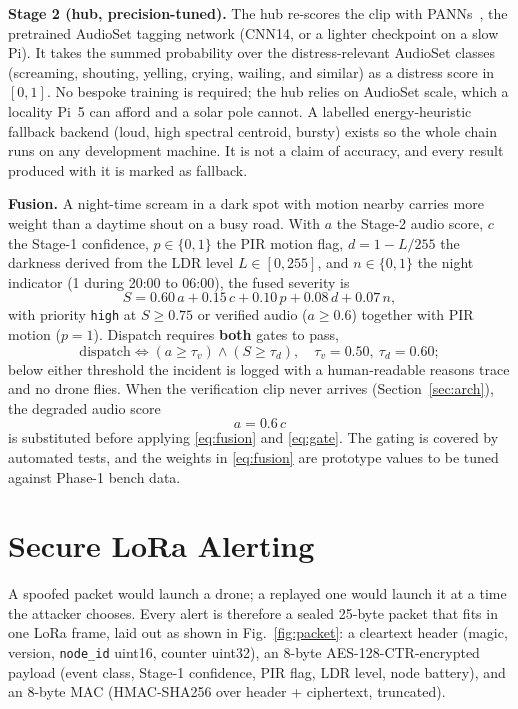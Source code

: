 \documentclass[conference]{IEEEtran}
\begin{document}
\textbf{Stage 2 (hub, precision-tuned).} The hub re-scores the clip
with PANNs~\cite{panns}, the pretrained AudioSet tagging network
(CNN14, or a lighter checkpoint on a slow Pi). It takes the summed
probability over the distress-relevant AudioSet classes (screaming,
shouting, yelling, crying, wailing, and similar) as a distress score
in $[0, 1]$. No bespoke training is required; the hub relies on
AudioSet scale, which a locality Pi~5 can afford and a solar pole
cannot. A labelled energy-heuristic fallback backend (loud, high
spectral centroid, bursty) exists so the whole chain runs on any
development machine. It is not a claim of accuracy, and every result
produced with it is marked as fallback.

\textbf{Fusion.} A night-time scream in a dark spot with motion nearby
carries more weight than a daytime shout on a busy road. With $a$
the Stage-2 audio score, $c$ the Stage-1 confidence, $p \in \{0,1\}$
the PIR motion flag, $d = 1 - L/255$ the darkness derived from the LDR
level $L \in [0,255]$, and $n \in \{0,1\}$ the night indicator (1
during 20:00 to 06:00), the fused severity is
\begin{equation}
\label{eq:fusion}
S = 0.60\,a + 0.15\,c + 0.10\,p + 0.08\,d + 0.07\,n,
\end{equation}
with priority \texttt{high} at $S \geq 0.75$ or verified audio
($a \geq 0.6$) together with PIR motion ($p = 1$). Dispatch requires
\textbf{both} gates to pass,
\begin{equation}
\label{eq:gate}
\mathrm{dispatch} \iff (a \geq \tau_v) \wedge (S \geq \tau_d),
\quad \tau_v = 0.50,\ \tau_d = 0.60;
\end{equation}
below either threshold the incident is logged with a human-readable
reasons trace and no drone flies. When the verification clip never
arrives (Section~\ref{sec:arch}), the degraded audio score
\begin{equation}
\label{eq:degraded}
a = 0.6\,c
\end{equation}
is substituted before applying \eqref{eq:fusion} and \eqref{eq:gate}.
The gating is covered by automated tests, and the weights in
\eqref{eq:fusion} are prototype values to be tuned against Phase-1
bench data.

\section{Secure LoRa Alerting}
\label{sec:lora}

A spoofed packet would launch a drone; a replayed one would launch it
at a time the attacker chooses. Every alert is therefore a sealed
25-byte packet that fits in one LoRa frame, laid out as shown in
Fig.~\ref{fig:packet}: a cleartext header (magic, version,
\texttt{node\_id} uint16, counter uint32), an 8-byte
AES-128-CTR-encrypted payload (event class, Stage-1 confidence, PIR
flag, LDR level, node battery), and an 8-byte MAC (HMAC-SHA256 over
header + ciphertext, truncated).
\end{document}
